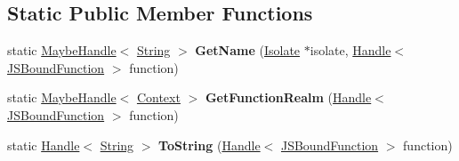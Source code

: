 \subsection*{Static Public Member Functions}
\begin{DoxyCompactItemize}
\item 
static \hyperlink{classv8_1_1internal_1_1_maybe_handle}{Maybe\+Handle}$<$ \hyperlink{classv8_1_1internal_1_1_string}{String} $>$ {\bfseries Get\+Name} (\hyperlink{classv8_1_1internal_1_1_isolate}{Isolate} $\ast$isolate, \hyperlink{classv8_1_1internal_1_1_handle}{Handle}$<$ \hyperlink{classv8_1_1internal_1_1_j_s_bound_function}{J\+S\+Bound\+Function} $>$ function)\hypertarget{classv8_1_1internal_1_1_j_s_bound_function_abfe268881f314599a7df612a13a2686a}{}\label{classv8_1_1internal_1_1_j_s_bound_function_abfe268881f314599a7df612a13a2686a}

\item 
static \hyperlink{classv8_1_1internal_1_1_maybe_handle}{Maybe\+Handle}$<$ \hyperlink{classv8_1_1internal_1_1_context}{Context} $>$ {\bfseries Get\+Function\+Realm} (\hyperlink{classv8_1_1internal_1_1_handle}{Handle}$<$ \hyperlink{classv8_1_1internal_1_1_j_s_bound_function}{J\+S\+Bound\+Function} $>$ function)\hypertarget{classv8_1_1internal_1_1_j_s_bound_function_a8e212c3a1099155f0086edcf13899c21}{}\label{classv8_1_1internal_1_1_j_s_bound_function_a8e212c3a1099155f0086edcf13899c21}

\item 
static \hyperlink{classv8_1_1internal_1_1_handle}{Handle}$<$ \hyperlink{classv8_1_1internal_1_1_string}{String} $>$ {\bfseries To\+String} (\hyperlink{classv8_1_1internal_1_1_handle}{Handle}$<$ \hyperlink{classv8_1_1internal_1_1_j_s_bound_function}{J\+S\+Bound\+Function} $>$ function)\hypertarget{classv8_1_1internal_1_1_j_s_bound_function_a0f16413d1796af697a95e2d736e8cfc0}{}\label{classv8_1_1internal_1_1_j_s_bound_function_a0f16413d1796af697a95e2d736e8cfc0}

\end{DoxyCompactItemize}
